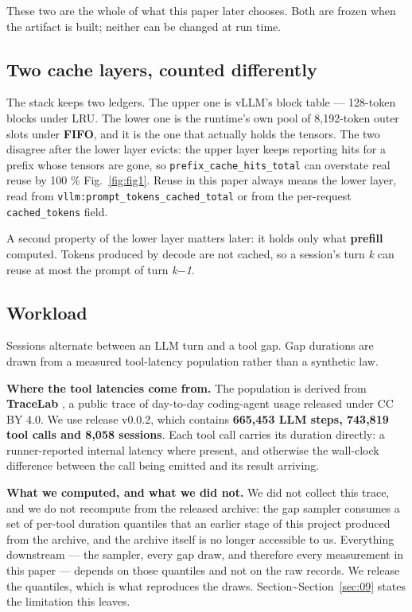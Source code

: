 These two are the whole of what this paper later chooses. Both are frozen when the artifact is built; neither can be changed at run time.

\subsection{Two cache layers, counted differently}

The stack keeps two ledgers. The upper one is vLLM's block table --- 128-token blocks under LRU. The lower one is the runtime's own pool of 8,192-token outer slots under \textbf{FIFO}, and it is the one that actually holds the tensors. The two disagree after the lower layer evicts: the upper layer keeps reporting hits for a prefix whose tensors are gone, so \texttt{prefix\_cache\_hits\_total} can overstate real reuse by 100 \% Fig.~\ref{fig:fig1}. Reuse in this paper always means the lower layer, read from \texttt{vllm:prompt\_\allowbreak{}tokens\_\allowbreak{}cached\_\allowbreak{}total} or from the per-request \texttt{cached\_tokens} field.

A second property of the lower layer matters later: it holds only what \textbf{prefill} computed. Tokens produced by decode are not cached, so a session's turn \emph{k} can reuse at most the prompt of turn \emph{k$-$1}.

\subsection{Workload}

Sessions alternate between an LLM turn and a tool gap. Gap durations are drawn from a measured tool-latency population rather than a synthetic law.

\textbf{Where the tool latencies come from.} The population is derived from \textbf{TraceLab} \cite{tracelab2026}, a public trace of day-to-day coding-agent usage released under CC BY 4.0. We use release v0.0.2, which contains \textbf{665,453 LLM steps, 743,819 tool calls and 8,058 sessions}. Each tool call carries its duration directly: a runner-reported internal latency where present, and otherwise the wall-clock difference between the call being emitted and its result arriving.

\textbf{What we computed, and what we did not.} We did not collect this trace, and we do not recompute from the released archive: the gap sampler consumes a set of per-tool duration quantiles that an earlier stage of this project produced from the archive, and the archive itself is no longer accessible to us. Everything downstream --- the sampler, every gap draw, and therefore every measurement in this paper --- depends on those quantiles and not on the raw records. We release the quantiles, which is what reproduces the draws. Section\textasciitilde{}Section~\ref{sec:09} states the limitation this leaves.

